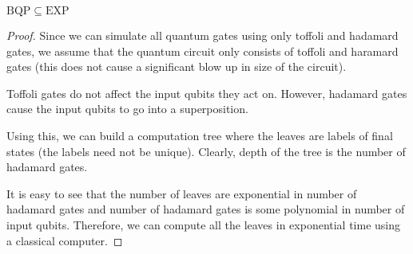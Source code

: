 \documentclass[../main.tex]{subfiles}
\begin{document}
\begin{theorem}
$\mathrm{BQP}\subseteq\mathrm{EXP}$
\end{theorem}
\begin{proof}
Since we can simulate all quantum gates using only toffoli and hadamard gates, we assume that the quantum circuit only consists of toffoli and haramard gates (this does not cause a significant blow up in size of the circuit).

\noindent Toffoli gates do not affect the input qubits they act on. However, hadamard gates cause the input qubits to go into a superposition.

\noindent Using this, we can build a computation tree where the leaves are labels of final states (the labels need not be unique). Clearly, depth of the tree is the number of hadamard gates.

\begin{center}
\end{center}

\noindent It is easy to see that the number of leaves are exponential in number of hadamard gates and number of hadamard gates is some polynomial in number of input qubits. Therefore, we can compute all the leaves in exponential time using a classical computer.
\end{proof}
\end{document}
